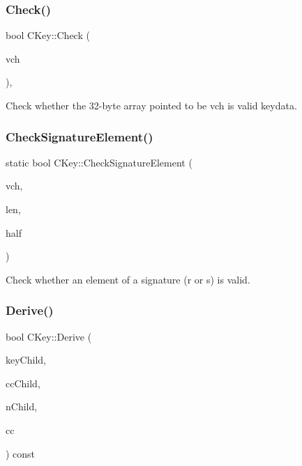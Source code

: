 \mbox{\label{class_c_key_acec869bc75fa8f4d619ab025d367a97c}} 
\subsubsection{\texorpdfstring{Check()}{Check()}}
{\footnotesize\ttfamily bool C\+Key\+::\+Check (\begin{DoxyParamCaption}\item[{const unsigned char $\ast$}]{vch }\end{DoxyParamCaption})\hspace{0.3cm}{\ttfamily [static]}, {\ttfamily [private]}}



Check whether the 32-\/byte array pointed to be vch is valid keydata. 

\mbox{\label{class_c_key_a625c363d9adfbd4dda22f3a67a898cf4}} 
\subsubsection{\texorpdfstring{Check\+Signature\+Element()}{CheckSignatureElement()}}
{\footnotesize\ttfamily static bool C\+Key\+::\+Check\+Signature\+Element (\begin{DoxyParamCaption}\item[{const unsigned char $\ast$}]{vch,  }\item[{int}]{len,  }\item[{bool}]{half }\end{DoxyParamCaption})\hspace{0.3cm}{\ttfamily [static]}}



Check whether an element of a signature (r or s) is valid. 

\mbox{\label{class_c_key_ae79008cec2eb799a2efd37e010996acf}} 
\subsubsection{\texorpdfstring{Derive()}{Derive()}}
{\footnotesize\ttfamily bool C\+Key\+::\+Derive (\begin{DoxyParamCaption}\item[{\mbox{\hyperlink{class_c_key}{C\+Key}} \&}]{key\+Child,  }\item[{\mbox{\hyperlink{hash_8h_aa201a9867f780a040c7af908e0a85db3}{Chain\+Code}} \&}]{cc\+Child,  }\item[{unsigned int}]{n\+Child,  }\item[{const \mbox{\hyperlink{hash_8h_aa201a9867f780a040c7af908e0a85db3}{Chain\+Code}} \&}]{cc }\end{DoxyParamCaption}) const}



